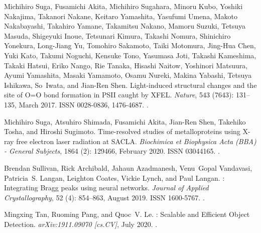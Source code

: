 \documentclass[a4paper]{article}
\begin{document}
\begin{thebibliography}{33}
Michihiro Suga, Fusamichi Akita, Michihiro Sugahara, Minoru Kubo, Yoshiki
  Nakajima, Takanori Nakane, Keitaro Yamashita, Yasufumi Umena, Makoto
  Nakabayashi, Takahiro Yamane, Takamitsu Nakano, Mamoru Suzuki, Tetsuya
  Masuda, Shigeyuki Inoue, Tetsunari Kimura, Takashi Nomura, Shinichiro
  Yonekura, Long-Jiang Yu, Tomohiro Sakamoto, Taiki Motomura, Jing-Hua Chen,
  Yuki Kato, Takumi Noguchi, Kensuke Tono, Yasumasa Joti, Takashi Kameshima,
  Takaki Hatsui, Eriko Nango, Rie Tanaka, Hisashi Naitow, Yoshinori Matsuura,
  Ayumi Yamashita, Masaki Yamamoto, Osamu Nureki, Makina Yabashi, Tetsuya
  Ishikawa, So~Iwata, and Jian-Ren Shen.
\newblock Light-induced structural changes and the site of {{O}}={{O}} bond
  formation in {{PSII}} caught by {{XFEL}}.
\newblock \emph{Nature}, 543 (7643): 131--135, March 2017.
\newblock ISSN 0028-0836, 1476-4687.
\newblock {}.

Michihiro Suga, Atsuhiro Shimada, Fusamichi Akita, Jian-Ren Shen, Takehiko
  Tosha, and Hiroshi Sugimoto.
\newblock Time-resolved studies of metalloproteins using {{X-ray}} free
  electron laser radiation at {{SACLA}}.
\newblock \emph{Biochimica et Biophysica Acta (BBA) - General Subjects},
  1864 (2): 129466, February 2020.
\newblock ISSN 03044165.
\newblock {}.

Brendan Sullivan, Rick Archibald, Jahaun Azadmanesh, Venu~Gopal Vandavasi,
  Patricia~S. Langan, Leighton Coates, Vickie Lynch, and Paul Langan.
: Integrating {{Bragg}} peaks using neural networks.
\newblock \emph{Journal of Applied Crystallography}, 52 (4):
  854--863, August 2019.
\newblock ISSN 1600-5767.
\newblock {}.

Mingxing Tan, Ruoming Pang, and Quoc~V. Le.
: {{Scalable}} and {{Efficient Object Detection}}.
\newblock \emph{arXiv:1911.09070 [cs.CV]}, July 2020.
\newblock {}.


\end{thebibliography}
\end{document}
